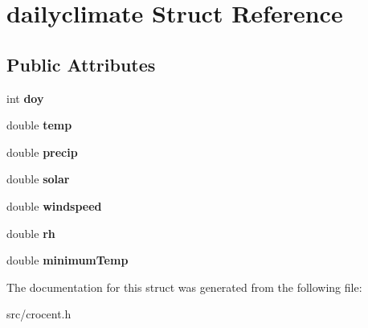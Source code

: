 \hypertarget{structdailyclimate}{\section{dailyclimate Struct Reference}
\label{structdailyclimate}
}
\subsection*{Public Attributes}
\begin{DoxyCompactItemize}
\item 
\hypertarget{structdailyclimate_ab117386c60157f6d1fa37d0b90264772}{int {\bfseries doy}}\label{structdailyclimate_ab117386c60157f6d1fa37d0b90264772}

\item 
\hypertarget{structdailyclimate_a2d19c2f32ce8a378d40253f138958ddc}{double {\bfseries temp}}\label{structdailyclimate_a2d19c2f32ce8a378d40253f138958ddc}

\item 
\hypertarget{structdailyclimate_ad4d814b84e7cbd0f0f6453cd4279475f}{double {\bfseries precip}}\label{structdailyclimate_ad4d814b84e7cbd0f0f6453cd4279475f}

\item 
\hypertarget{structdailyclimate_a9adb9a265039e5d23a4fd0a0784e6dda}{double {\bfseries solar}}\label{structdailyclimate_a9adb9a265039e5d23a4fd0a0784e6dda}

\item 
\hypertarget{structdailyclimate_ac7d990404f263a202ce8de0aab50aea2}{double {\bfseries windspeed}}\label{structdailyclimate_ac7d990404f263a202ce8de0aab50aea2}

\item 
\hypertarget{structdailyclimate_a889cd5f88f1557306c1919cc61e75147}{double {\bfseries rh}}\label{structdailyclimate_a889cd5f88f1557306c1919cc61e75147}

\item 
\hypertarget{structdailyclimate_a48a251755b530100fc15010676165439}{double {\bfseries minimum\-Temp}}\label{structdailyclimate_a48a251755b530100fc15010676165439}

\end{DoxyCompactItemize}


The documentation for this struct was generated from the following file\-:\begin{DoxyCompactItemize}
\item 
src/crocent.\-h\end{DoxyCompactItemize}
